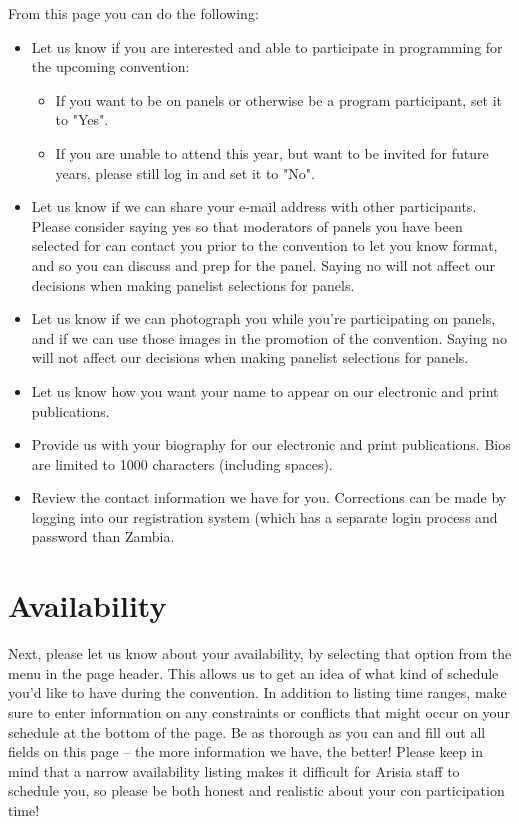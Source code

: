 \documentclass[captions=tablesignature]{scrartcl}
\begin{document}
From this page you can do the following:
\begin{itemize}
\item Let us know if you are interested and able to participate in
programming for the upcoming convention:
\begin{itemize}
\item If you want to be on panels or otherwise be a program
participant, set it to "Yes".
\item If you are unable to attend this year, but want to be invited
for future years, please still log in and set it to "No".
\end{itemize}
\item Let us know if we can share your e-mail address with other
participants.  Please consider saying yes so that moderators of
panels you have been selected for can contact you prior to the
convention to let you know format, and so you can discuss and prep
for the panel.  Saying no will not affect our decisions when
making panelist selections for panels.
\item Let us know if we can photograph you while you’re participating on
panels, and if we can use those images in the promotion of the
convention.  Saying no will not affect our decisions when making
panelist selections for panels.
\item Let us know how you want your name to appear on our electronic and
print publications.
\item Provide us with your biography for our electronic and print
publications.  Bios are limited to 1000 characters (including
spaces).
\item Review the contact information we have for you. Corrections can be
made by logging into our registration system (which has a separate
login process and password than Zambia.
\end{itemize}

\section{Availability}
\label{sec-3}
Next, please let us know about your availability, by selecting that
option from the menu in the page header. This allows us to get an
idea of what kind of schedule you’d like to have during the
convention. In addition to listing time ranges, make sure to enter
information on any constraints or conflicts that might occur on your
schedule at the bottom of the page. Be as thorough as you can and
fill out all fields on this page -- the more information we have,
the better! Please keep in mind that a narrow availability listing
makes it difficult for Arisia staff to schedule you, so please be
both honest and realistic about your con participation time!
\end{document}
